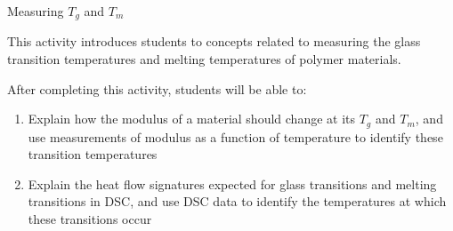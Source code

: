 %
%
%
%

\renewcommand{\figpath}{content/polymphys/thermal-transitions/thermal-characterization/figs}
\renewcommand{\labelbase}{thermal-characterization}

\begin{activity}{Measuring $T_g$ and $T_m$}

\begin{instructornotes}
	This activity introduces students to concepts related to measuring the glass transition temperatures and melting temperatures of polymer materials.
	
	After completing this activity, students will be able to:
	\begin{enumerate}
		\item Explain how the modulus of a material should change at its $T_g$ and $T_m$, and use measurements of modulus as a function of temperature to identify these transition temperatures
		\item Explain the heat flow signatures expected for glass transitions and melting transitions in DSC, and use DSC data to identify the temperatures at which these transitions occur
	\end{enumerate}
	

\end{instructornotes}
\end{activity}
